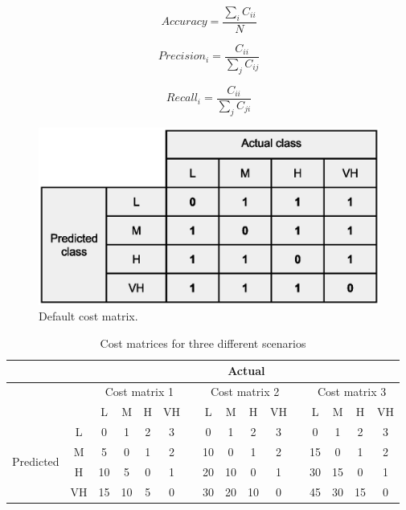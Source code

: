 \documentclass[a4paper,10pt,onecolumn,preprint,3p]{elsarticle}
\begin{document}
\begin{equation}
Accuracy=\frac{\sum_{i}C_{ii}}{N}
\label{equation:acc}
\end{equation}


\begin{equation}
Precision_{i}=\frac{C_{ii}}{\sum_{j}C_{ij}}
\label{equation:precision}
\end{equation}


\begin{equation}
Recall_{i}=\frac{C_{ii}}{\sum_{j}C_{ji}}
\label{equation:recall}
\end{equation}

\begin{figure}[ht]
\begin{center}
\includegraphics[scale=0.40]{Confusion-matrix-multiclass-default}
\end{center}
\caption{Default cost matrix.}
\label{fig:Default_cost_matrix}
\end{figure}




\begin{table}
\caption{Cost matrices for three different scenarios}
\centering{}%
\begin{tabular}{|c|c|c|c|c|c|c|c|c|c|c|c|c|c|c|c|}
\hline 
\multicolumn{2}{|c|}{} & \multicolumn{14}{c|}{Actual}\tabularnewline
\hline 
\multicolumn{2}{|c|}{} & \multicolumn{4}{c|}{Cost matrix 1} & \multirow{6}{*}{} & \multicolumn{4}{c|}{Cost matrix 2} & \multirow{6}{*}{} & \multicolumn{4}{c|}{Cost matrix 3}\tabularnewline
\cline{1-6} \cline{8-11} \cline{13-16} 
\multicolumn{2}{|c|}{} & L & M & H & VH &  & L & M & H & VH &  & L & M & H & VH\tabularnewline
\cline{1-6} \cline{8-11} \cline{13-16} 
\multirow{4}{*}{Predicted} & L & 0 & 1 & 2 & 3 &  & 0 & 1 & 2 & 3 &  & 0 & 1 & 2 & 3\tabularnewline
\cline{2-6} \cline{8-11} \cline{13-16} 
 & M & 5 & 0 & 1 & 2 &  & 10 & 0 & 1 & 2 &  & 15 & 0 & 1 & 2\tabularnewline
\cline{2-6} \cline{8-11} \cline{13-16} 
 & H & 10 & 5 & 0 & 1 &  & 20 & 10 & 0 & 1 &  & 30 & 15 & 0 & 1\tabularnewline
\cline{2-6} \cline{8-11} \cline{13-16} 
 & VH & 15 & 10 & 5 & 0 &  & 30 & 20 & 10 & 0 &  & 45 & 30 & 15 & 0\tabularnewline
\hline 
\end{tabular}
\end{table}
\end{document}
